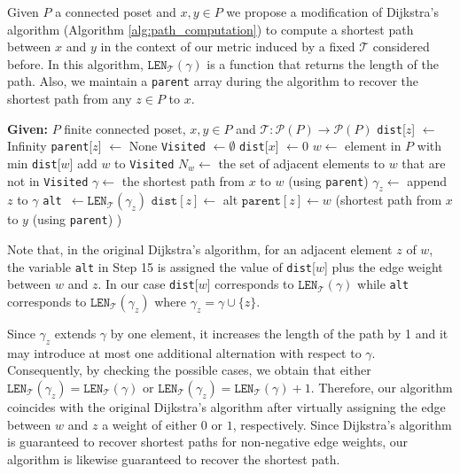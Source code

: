 \documentclass{article}[12pt]
\theoremstyle{exampstyle}
\theoremstyle{remark}
\renewcommand{\P}{\mathcal{P}}
\newcommand{\T}{\mathcal{T}}
\begin{document}
Given $P$ a connected poset and $x,y \in P$ we propose a modification of Dijkstra's algorithm \cite{Dijkstra1959} (Algorithm \ref{alg:path_computation}) to compute a shortest path between $x$ and $y$ in the context of our metric induced by a fixed $\T$ considered before. In this algorithm, $\texttt{LEN}_{\T}(\gamma)$ is a function that returns the length of the path. Also, we maintain a \texttt{parent} array during the algorithm to recover the shortest path from any $z \in P$ to $x$.

\begin{algorithm}[ht] %
\caption[Algorithm to compute shortest path]{Algorithm to compute a shortest path between $x$ and $y$ in a finite connected poset $P$}
\label{alg:path_computation}

\begin{algorithmic}[1]
\State \textbf{Given:} $P$ finite connected poset, $x,y \in P$ and $\T: \P(P) \to \P(P) $
\State \texttt{dist}[$z$] $\gets$ Infinity
\State \texttt{parent}[$z$] $\gets$ None
\EndFor
\State \texttt{Visited} $\gets \emptyset$
\State \texttt{dist}[$x$] $\gets 0$
\State $w \gets$ element in $P$ with min \texttt{dist}[$w$]
\State add $w$ to \texttt{Visited}
\State $N_w \gets$ the set of adjacent elements to $w$ that are not in \texttt{Visited}
\State $\gamma \gets$ the shortest path from $x$ to $w$ (using \texttt{parent}) 
\State $\gamma_z \gets$ append $z$ to $\gamma$
\State \texttt{alt }$\gets \texttt{LEN}_\T(\gamma_z)$ 
\State $\texttt{dist}[z] \gets $ alt
\State $\texttt{parent}[z] \gets w$
\EndIf
\EndFor
\EndWhile
\State \Return(shortest path from $x$ to $y$ (using \texttt{parent}) )
\end{algorithmic}
\end{algorithm}

Note that, in the original Dijkstra's algorithm, for an adjacent element $z$ of $w$, the variable \texttt{alt} in Step 15 is assigned the value of \texttt{dist}[$w$] plus the edge weight between $w$ and $z$. In our case \texttt{dist}[$w$] corresponds to $ \texttt{LEN}_\T(\gamma)$ while \texttt{alt} corresponds to $ \texttt{LEN}_\T(\gamma_z)$ where $\gamma_z = \gamma \cup \{z\}$.

Since $\gamma_z$ extends $\gamma$ by one element, it increases the length of the path by 1 and it may introduce at most one additional alternation with respect to $\gamma$.
Consequently, by checking the possible cases, we obtain that either $\texttt{LEN}_\T(\gamma_z) =  \texttt{LEN}_\T(\gamma)$ or $\texttt{LEN}_\T(\gamma_z) =  \texttt{LEN}_\T(\gamma) + 1$. Therefore, our algorithm coincides with the original Dijkstra's algorithm after virtually assigning the edge between $w$ and $z$ a weight of either $0$ or $1$, respectively. Since Dijkstra's algorithm is guaranteed to recover shortest paths for non-negative edge weights, our algorithm is likewise guaranteed to recover the shortest path.
\end{document}
